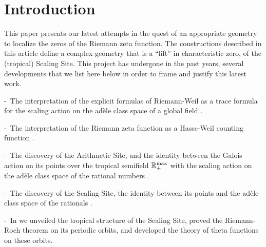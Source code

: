 \documentclass[graybox, envcountsect%
]{svmult}
\def\R{{\mathbb R}}
\def\no{\noindent}
\def\rmax{\R_+^{\rm max}}
\begin{document}
\section{Introduction}
\label{sec:1}


This paper presents our latest attempts in the quest of an appropriate geometry to localize the zeros of the Riemann zeta function. The constructions described in this article  define a complex geometry  that is a ``lift'' in characteristic zero, of the (tropical) Scaling Site. This project has undergone in the past years, several  developments that we list here below in order to frame and justify this latest work.\vspace{.04in}  


\no -~The interpretation of the explicit formulas of Riemann-Weil as a trace formula for the scaling action on the ad\`ele class space of a global field \cite{Co-zeta,Meyer}.
\vspace{.03in}

\no -~The interpretation of the Riemann zeta function as a Hasse-Weil counting function \cite{CC0,CC0.5}.\vspace{.03in}

\no -~The discovery of the Arithmetic Site, and the identity between the Galois action on its points over the tropical semifield $\rmax$ with  the scaling action on the ad\`ele class space of the rational numbers \cite{CC1,CC2}.\vspace{.03in}

\no -~The discovery of the Scaling Site, the identity between its points and the ad\`ele class space of the rationals \cite{CC3}.
\vspace{.03in}

\no -~In \cite{CC4} we unveiled the tropical structure of the Scaling Site, proved the Riemann-Roch theorem  on its periodic orbits, and developed   the  theory of theta functions on these orbits.\vspace{.04in}
\end{document}
